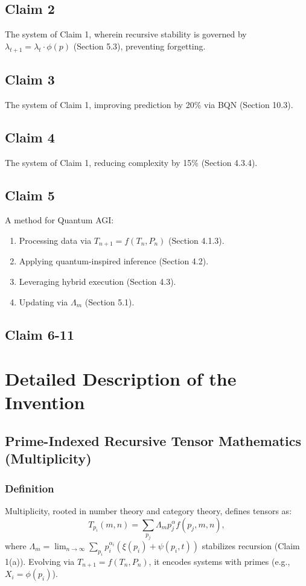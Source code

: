 \documentclass{article}
\theoremstyle{plain}
\theoremstyle{claimstyle}
\begin{document}
\subsection{Claim 2}
The system of Claim 1, wherein recursive stability is governed by \(\lambda_{t+1} = \lambda_t \cdot \phi(p)\) (Section 5.3), preventing forgetting.

\subsection{Claim 3}
The system of Claim 1, improving prediction by 20\% via BQN (Section 10.3).

\subsection{Claim 4}
The system of Claim 1, reducing complexity by 15\% (Section 4.3.4).

\subsection{Claim 5}
A method for Quantum AGI:
\begin{enumerate}[label=(\alph*)]
    \item Processing data via \( T_{n+1} = f(T_n, P_n) \) (Section 4.1.3).
    \item Applying quantum-inspired inference (Section 4.2).
    \item Leveraging hybrid execution (Section 4.3).
    \item Updating via \(\Lambda_m\) (Section 5.1).
\end{enumerate}

\subsection{Claim 6-11}

\section{Detailed Description of the Invention}
\subsection{Prime-Indexed Recursive Tensor Mathematics (Multiplicity)}
\subsubsection{Definition}
Multiplicity, rooted in number theory and category theory, defines tensors as:
\begin{equation}
    T_{p_i}(m, n) = \sum_{p_j} \Lambda_m p_j^\alpha f(p_j, m, n),
\end{equation}
where \(\Lambda_m = \lim_{n \to \infty} \sum_{p_i} p_i^{\alpha_i} (\xi(p_i) + \psi(p_i, t))\) stabilizes recursion (Claim 1(a)). Evolving via \( T_{n+1} = f(T_n, P_n) \), it encodes systems with primes (e.g., \( X_i = \phi(p_i) \)).
\end{document}
